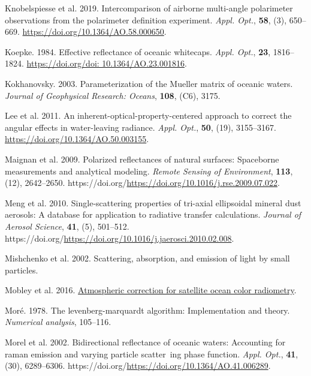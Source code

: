 \documentclass[
  11pt,
  letterpaper,
]{scrreprt}
\newlength{\cslhangindent}
\newenvironment{CSLReferences}[2] %
 {\begin{list}{}{%
  \setlength{\itemindent}{0pt}
  \setlength{\leftmargin}{0pt}
  \setlength{\parsep}{0pt}
  \ifodd #1
   \setlength{\leftmargin}{\cslhangindent}
   \setlength{\itemindent}{-1\cslhangindent}
  \fi
  \setlength{\itemsep}{#2\baselineskip}}}
 {\end{list}}
\begin{document}
\begin{CSLReferences}{1}{1}
Knobelspiesse et al. 2019. Intercomparison of airborne multi-angle
polarimeter observations from the polarimeter definition experiment.
\emph{Appl. Opt.}, \textbf{58}, (3), 650--669.
\url{https://doi.org/10.1364/AO.58.000650}.

Koepke. 1984. Effective reflectance of oceanic whitecaps. \emph{Appl.
Opt.}, \textbf{23}, 1816--1824.
\href{https://doi.org/doi:\%2010.1364/AO.23.001816}{https://doi.org/doi:
10.1364/AO.23.001816}.

Kokhanovsky. 2003. {Parameterization of the Mueller matrix of oceanic
waters}. \emph{Journal of Geophysical Research: Oceans}, \textbf{108},
(C6), 3175.

Lee et al. 2011. An inherent-optical-property-centered approach to
correct the angular effects in water-leaving radiance. \emph{Appl.
Opt.}, \textbf{50}, (19), 3155--3167.
\url{https://doi.org/10.1364/AO.50.003155}.

Maignan et al. 2009. Polarized reflectances of natural surfaces:
Spaceborne measurements and analytical modeling. \emph{Remote Sensing of
Environment}, \textbf{113}, (12), 2642--2650.
https://doi.org/\url{https://doi.org/10.1016/j.rse.2009.07.022}.

Meng et al. 2010. Single-scattering properties of tri-axial ellipsoidal
mineral dust aerosols: A database for application to radiative transfer
calculations. \emph{Journal of Aerosol Science}, \textbf{41}, (5),
501--512.
https://doi.org/\url{https://doi.org/10.1016/j.jaerosci.2010.02.008}.

Mishchenko et al. 2002. Scattering, absorption, and emission of light by
small particles.

Mobley et al. 2016.
\href{https://oceancolor.gsfc.nasa.gov/docs/technical/NASA-TM-2016-217551.pdf}{Atmospheric
correction for satellite ocean color radiometry}.

Moré. 1978. The levenberg-marquardt algorithm: Implementation and
theory. \emph{Numerical analysis}, 105--116.

Morel et al. 2002. Bidirectional reflectance of oceanic waters:
Accounting for raman emission and varying particle scatter~ing phase
function. \emph{Appl. Opt.}, \textbf{41}, (30), 6289--6306.
https://doi.org/\url{https://doi.org/10.1364/AO.41.006289}.


\end{CSLReferences}
\end{document}
